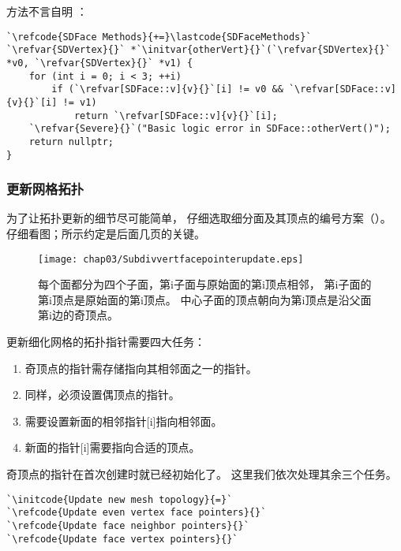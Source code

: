 方法不言自明
：
\begin{lstlisting}
`\refcode{SDFace Methods}{+=}\lastcode{SDFaceMethods}`
`\refvar{SDVertex}{}` *`\initvar{otherVert}{}`(`\refvar{SDVertex}{}` *v0, `\refvar{SDVertex}{}` *v1) {
    for (int i = 0; i < 3; ++i)
        if (`\refvar[SDFace::v]{v}{}`[i] != v0 && `\refvar[SDFace::v]{v}{}`[i] != v1)
            return `\refvar[SDFace::v]{v}{}`[i];
    `\refvar{Severe}{}`("Basic logic error in SDFace::otherVert()");
    return nullptr;
}
\end{lstlisting}

\subsubsection*{更新网格拓扑}
为了让拓扑更新的细节尽可能简单，
仔细选取细分面及其顶点的编号方案（）。
仔细看图；所示约定是后面几页的关键。
\begin{figure}[htbp]
    \centering\texttt{[image: chap03/Subdivvertfacepointerupdate.eps]}
    \caption{每个面都分为四个子面，第{\ttfamily i}子面与原始面的第{\ttfamily i}顶点相邻，
    第{\ttfamily i}子面的第{\ttfamily i}顶点是原始面的第{\ttfamily i}顶点。
    中心子面的顶点朝向为第{\ttfamily i}顶点是沿父面第{\ttfamily i}边的奇顶点。}
    \label{fig:3.36}
\end{figure}

更新细化网格的拓扑指针需要四大任务：
\begin{enumerate}
    \item 奇顶点的指针需存储指向其相邻面之一的指针。
    \item 同样，必须设置偶顶点的指针。
    \item 需要设置新面的相邻指针{\ttfamily{}[i]}指向相邻面。
    \item 新面的指针{\ttfamily{}[i]}需要指向合适的顶点。
\end{enumerate}

奇顶点的指针在首次创建时就已经初始化了。
这里我们依次处理其余三个任务。
\begin{lstlisting}
`\initcode{Update new mesh topology}{=}`
`\refcode{Update even vertex face pointers}{}`
`\refcode{Update face neighbor pointers}{}`
`\refcode{Update face vertex pointers}{}`
\end{lstlisting}

